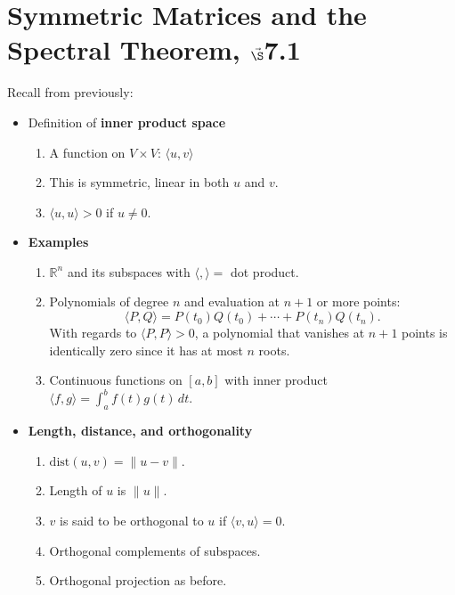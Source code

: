 
%




\section{{Symmetric Matrices and the Spectral Theorem, $\vec\S$7.1}}

%
\thispagestyle{fancy}

Recall from previously:

\begin{itemize}
\item[(a)] Definition of \textbf{inner product space}
\begin{enumerate}
    \item A function on $V \times V$: $\langle u, v \rangle$
    \item This is symmetric, linear in both $u$ and $v$.
    \item $\langle u, u \rangle > 0$ if $u \neq 0$.
\end{enumerate}

\item[(b)] \textbf{Examples}
\begin{enumerate}
    \item $\mathbb{R}^n$ and its subspaces with $\langle , \rangle = $ dot product.
    \item Polynomials of degree $n$ and evaluation at $n+1$ or more points:
    \[
    \langle P, Q \rangle = P(t_0)Q(t_0) + \cdots + P(t_n)Q(t_n).
    \]
    With regards to $\langle P, P \rangle > 0$, a polynomial that vanishes at $n+1$ points is identically zero since it has at most $n$ roots.
    \item Continuous functions on $[a, b]$ with inner product
    $
    \langle f, g \rangle = \int_a^b f(t)g(t) \, dt.
    $
\end{enumerate}

\item[(c)] \textbf{Length, distance, and orthogonality}
\begin{enumerate}
    \item $\text{dist}(u, v) = \|u - v\|.$
    \item Length of $u$ is $\|u\|.$
    \item $v$ is said to be orthogonal to $u$ if $\langle v,u \rangle = 0.$
    \item Orthogonal complements of subspaces.
    \item Orthogonal projection as before.
\end{enumerate}


\end{itemize}
